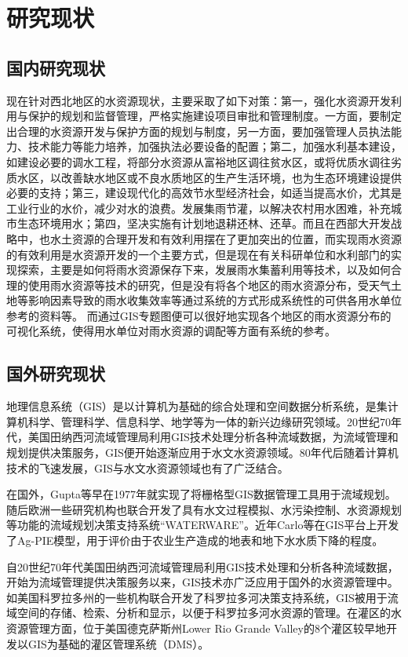\section{研究现状}
\subsection{国内研究现状}

现在针对西北地区的水资源现状，主要采取了如下对策：第一，强化水资源开发利用与保护的规划和监督管理，严格实施建设项目审批和管理制度。一方面，要制定出合理的水资源开发与保护方面的规划与制度，另一方面，要加强管理人员执法能力、技术能力等能力培养，加强执法必要设备的配置；第二，加强水利基本建设，如建设必要的调水工程，将部分水资源从富裕地区调往贫水区，或将优质水调往劣质水区，以改善缺水地区或不良水质地区的生产生活环境\cite{r1}，也为生态环境建设提供必要的支持；第三，建设现代化的高效节水型经济社会，如适当提高水价，尤其是工业行业的水价，减少对水的浪费。发展集雨节灌，以解决农村用水困难，补充城市生态环境用水；第四，坚决实施有计划地退耕还林、还草。而且在西部大开发战略中，也水土资源的合理开发和有效利用摆在了更加突出的位置，而实现雨水资源的有效利用是水资源开发的一个主要方式，但是现在有关科研单位和水利部门的实现探索，主要是如何将雨水资源保存下来，发展雨水集蓄利用等技术，以及如何合理的使用雨水资源等技术的研究，但是没有将各个地区的雨水资源分布，受天气土地等影响因素导致的雨水收集效率等通过系统的方式形成系统性的可供各用水单位参考的资料等。
而通过GIS专题图便可以很好地实现各个地区的雨水资源分布的可视化系统，使得用水单位对雨水资源的调配等方面有系统的参考。

\subsection{国外研究现状}
地理信息系统（GIS）是以计算机为基础的综合处理和空间数据分析系统，是集计算机科学、管理科学、信息科学、地学等为一体的新兴边缘研究领域。20世纪70年代，美国田纳西河流域管理局利用GIS技术处理分析各种流域数据，为流域管理和规划提供决策服务，GIS便开始逐渐应用于水文水资源领域。80年代后随着计算机技术的飞速发展，GIS与水文水资源领域也有了广泛结合。

在国外，Gupta等早在1977年就实现了将栅格型GIS数据管理工具用于流域规划。随后欧洲一些研究机构也联合开发了具有水文过程模拟、水污染控制、水资源规划等功能的流域规划决策支持系统“WATERWARE”。近年Carlo等在GIS平台上开发了Ag-PIE模型，用于评价由于农业生产造成的地表和地下水水质下降的程度。

自20世纪70年代美国田纳西河流域管理局利用GIS技术处理和分析各种流域数据，开始为流域管理提供决策服务以来，GIS技术亦广泛应用于国外的水资源管理中。如美国科罗拉多州的一些机构联合开发了科罗拉多河决策支持系统，GIS被用于流域空间的存储、检索、分析和显示，以便于科罗拉多河水资源的管理。在灌区的水资源管理方面，位于美国德克萨斯州Lower Rio Grande Valley的8个灌区较早地开发以GIS为基础的灌区管理系统（DMS）。

